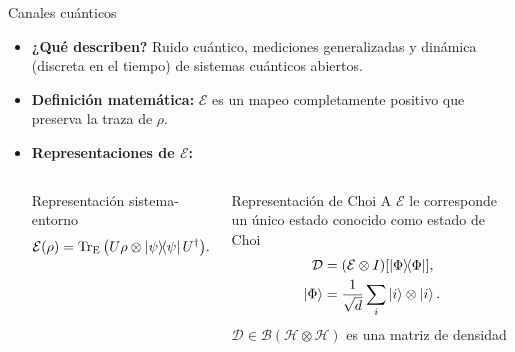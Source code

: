 \documentclass[10pt,handout]{beamer}
\begin{document}
\begin{frame}{Canales cuánticos}
\begin{itemize}
\item \textbf{¿Qué describen?} Ruido cuántico, mediciones generalizadas y \alert{dinámica (discreta en el tiempo) de sistemas cuánticos abiertos}. 

\item \textbf{Definición matemática:} $\mathcal E$ es un mapeo completamente positivo que preserva la traza de $\rho$.

\item \textbf{Representaciones de $\mathcal E$:}
\vspace*{-5mm}
\begin{columns}[t,onlytextwidth]
\begin{alertblock}{\color{black}Representación sistema-entorno}
\[
\mathcal{E}(\rho) 
=
\Tr_\mathrm{E}
\qty(
U 
\rho \otimes \dyad{\psi}
U^\dagger
).
\]
%
\begin{center}
\end{center}
\end{alertblock}

\begin{alertblock}{\color{black}Representación de Choi}
A $\mathcal E$ le corresponde un único estado conocido como \alert{estado de Choi}
\[\begin{aligned}
\mathcal{D} &= 
\qty(\mathcal{E} \otimes I )
\qty[\dyad{\Phi}],\\
\ket{\Phi} &= 
\frac{1}{\sqrt{d}}
\sum_i \ket{i}\otimes \ket{i}.
\end{aligned}\]
$\mathcal{D} \in \mathcal{B}(\mathcal H \otimes \mathcal H)$ es una matriz de densidad
\end{alertblock}
\end{columns}
\end{itemize}


\end{frame}
\end{document}
